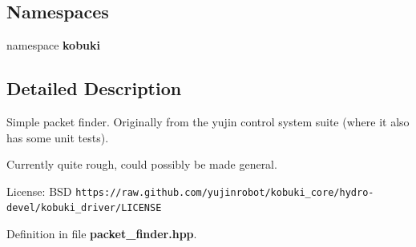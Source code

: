 \subsection*{\-Namespaces}
\begin{DoxyCompactItemize}
\item 
namespace {\bf kobuki}
\end{DoxyCompactItemize}


\subsection{\-Detailed \-Description}
\-Simple packet finder. \-Originally from the yujin control system suite (where it also has some unit tests).

\-Currently quite rough, could possibly be made general.

\-License\-: \-B\-S\-D {\tt https\-://raw.\-github.\-com/yujinrobot/kobuki\-\_\-core/hydro-\/devel/kobuki\-\_\-driver/\-L\-I\-C\-E\-N\-S\-E} 

\-Definition in file {\bf packet\-\_\-finder.\-hpp}.

